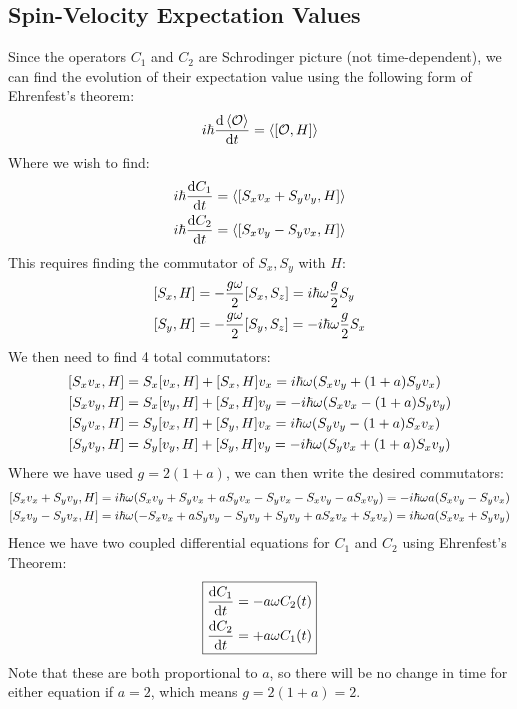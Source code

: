 \subsection{Spin-Velocity Expectation Values}
Since the operators $C_1$ and $C_2$ are Schrodinger picture (not time-dependent), we can find the evolution of their expectation value using the following form of Ehrenfest's theorem:
\begin{align*}
  i\hbar\dv{\ev{\mathcal{O}}}{t}=\ev{\comm{\mathcal{O}}{H}}
\end{align*}
Where we wish to find:
\begin{align*}
  i\hbar\dv{C_1}{t}&=\ev{\comm{S_xv_x+S_yv_y}{H}}\\
  i\hbar\dv{C_2}{t}&=\ev{\comm{S_xv_y-S_yv_x}{H}}
\end{align*}
This requires finding the commutator of $S_x,S_y$ with $H$:
\begin{align*}
  \comm{S_x}{H}&=-\frac{g\omega}2\comm{S_x}{S_z}=i\hbar\omega\frac{g}{2}S_y\\
  \comm{S_y}{H}&=-\frac{g\omega}2\comm{S_y}{S_z}=-i\hbar\omega\frac{g}{2}S_x
\end{align*}
We then need to find 4 total commutators:
\begin{align*}
  \comm{S_xv_x}{H}&=S_x\comm{v_x}{H}+\comm{S_x}{H}v_x
  =i\hbar\omega\qty(S_xv_y+(1+a)S_yv_x)\\
  \comm{S_xv_y}{H}&=S_x\comm{v_y}{H}+\comm{S_x}{H}v_y
  =-i\hbar\omega\qty(S_xv_x-(1+a)S_yv_y)\\
  \comm{S_yv_x}{H}&=S_y\comm{v_x}{H}+\comm{S_y}{H}v_x
  =i\hbar\omega\qty(S_yv_y-(1+a)S_xv_x)\\
  \comm{S_yv_y}{H}&=S_y\comm{v_y}{H}+\comm{S_y}{H}v_y
  =-i\hbar\omega\qty(S_yv_x+(1+a)S_xv_y)
\end{align*}
Where we have used $g=2(1+a)$, we can then write the desired commutators:
\begin{align*}
  \comm{S_xv_x+S_yv_y}{H}&=
  i\hbar\omega\qty(S_xv_y+S_yv_x+aS_yv_x-S_yv_x-S_xv_y-aS_xv_y)
  =-i\hbar\omega a\qty(S_xv_y-S_yv_x)\\
  \comm{S_xv_y-S_yv_x}{H}&=
  i\hbar\omega\qty(-S_xv_x+aS_yv_y-S_yv_y+S_yv_y+aS_xv_x+S_xv_x)
  =i\hbar\omega a\qty(S_xv_x+S_yv_y)
\end{align*}
Hence we have two coupled differential equations for $C_1$ and $C_2$ using Ehrenfest's Theorem:
\begin{equation}
  \label{eq:system}
  \boxed{\begin{aligned}
    \dv{C_1}{t}&=-a\omega C_2(t)\\
    \dv{C_2}{t}&=+a\omega C_1(t)
  \end{aligned}}
\end{equation}
Note that these are both proportional to $a$, so there will be no change in time for either equation if $a=2$, which means $g=2(1+a)=2$.

